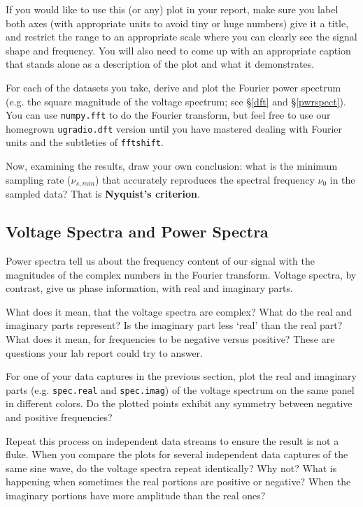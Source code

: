 \documentclass[11pt,preprint]{aastex}
\begin{document}
If you would like to use this (or any) plot in your report, make sure you label both axes (with
appropriate units to avoid tiny or huge numbers)
give it a title, and restrict the range to an appropriate scale where you can clearly see
the signal shape and frequency. You will also need to come up with an appropriate caption that
stands alone as a description of the plot and what it demonstrates.

For each of the datasets you take, derive and plot the Fourier power spectrum
(e.g. the square magnitude of the voltage spectrum; see \S\ref{dft} and \S\ref{pwrspect}). You can use {\tt numpy.fft} to do the Fourier
transform, 
but feel free to use our homegrown {\tt ugradio.dft} version until you have mastered dealing with
Fourier units and the subtleties of {\tt fftshift}.

Now, examining the results, draw your own conclusion: what is the
minimum sampling rate ($\nu_{s,min}$) that accurately reproduces the spectral frequency $\nu_0$ in
the sampled data?  That is {\bf Nyquist's criterion}. 

\subsection{Voltage Spectra and Power Spectra}

\noindent
Power spectra tell us about the frequency content of our signal with
the magnitudes of the complex numbers in the Fourier transform.  Voltage
spectra, by contrast, give us phase information,
with real and imaginary parts.

What does it mean, that the voltage spectra are complex? What do the real
and imaginary parts represent? Is the imaginary part less `real'
than the real part?
What does it mean, for frequencies to be negative versus
positive? These are questions your lab report could try to answer.

For one of your data captures in the previous section, plot the real and imaginary parts
(e.g. {\tt spec.real} and {\tt spec.imag})
of the voltage spectrum on the same panel in different colors.
Do the plotted points 
exhibit any symmetry between negative and positive
frequencies?

Repeat this process on independent data
streams to ensure the result is not a fluke.
When you compare the plots for several independent data captures of the same sine wave, do the
voltage spectra repeat identically?  Why not? What is happening when
sometimes the real portions are positive or negative? When the imaginary
portions have more amplitude than the real ones?
\end{document}
